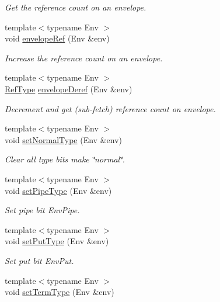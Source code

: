 \begin{DoxyCompactItemize}
\begin{DoxyCompactList}\small\item\em Get the reference count on an envelope. \end{DoxyCompactList}\item 
{\footnotesize template$<$typename Env $>$ }\\void \hyperlink{namespacevt_a68c41bd1b8addd0f8feea15a61d5c372}{envelope\+Ref} (Env \&env)
\begin{DoxyCompactList}\small\item\em Increase the reference count on an envelope. \end{DoxyCompactList}\item 
{\footnotesize template$<$typename Env $>$ }\\\hyperlink{namespacevt_a9b39ce9494bb04674d0d5b895a5aa50f}{Ref\+Type} \hyperlink{namespacevt_a6083c0bb47b5d180acb1f32542833e67}{envelope\+Deref} (Env \&env)
\begin{DoxyCompactList}\small\item\em Decrement and get (sub-\/fetch) reference count on envelope. \end{DoxyCompactList}\item 
{\footnotesize template$<$typename Env $>$ }\\void \hyperlink{namespacevt_aa76e59d48d53aa1e4c60bd55ff520d6a}{set\+Normal\+Type} (Env \&env)
\begin{DoxyCompactList}\small\item\em Clear all type bits make \char`\"{}normal\char`\"{}. \end{DoxyCompactList}\item 
{\footnotesize template$<$typename Env $>$ }\\void \hyperlink{namespacevt_a4ecba7a91cd1d5a6b6473cbac2042c2b}{set\+Pipe\+Type} (Env \&env)
\begin{DoxyCompactList}\small\item\em Set pipe bit {\ttfamily Env\+Pipe}. \end{DoxyCompactList}\item 
{\footnotesize template$<$typename Env $>$ }\\void \hyperlink{namespacevt_ab25ac0a12270d261c2f5c3c634f6370e}{set\+Put\+Type} (Env \&env)
\begin{DoxyCompactList}\small\item\em Set put bit {\ttfamily Env\+Put}. \end{DoxyCompactList}\item 
{\footnotesize template$<$typename Env $>$ }\\void \hyperlink{namespacevt_aa42d7e0adc8b283dd10602ece422699d}{set\+Term\+Type} (Env \&env)

\end{DoxyCompactItemize}
